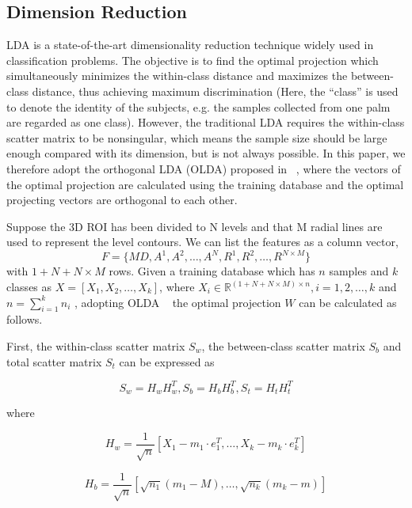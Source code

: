 \subsection{Dimension Reduction}
\label{ssec:methodology:lda}

LDA is a state-of-the-art dimensionality reduction technique widely used in classification problems. The objective is to find the optimal projection which simultaneously minimizes the within-class distance and maximizes the between-class distance, thus achieving maximum discrimination (Here, the “class” is used to denote the identity of the subjects, e.g. the samples collected from one palm are regarded as one class). However, the traditional LDA requires the within-class scatter matrix to be nonsingular, which means the sample size should be large enough compared with its dimension, but is not always possible. In this paper, we therefore adopt the orthogonal LDA (OLDA) proposed in ~\cite{Ye:2005uu}, where the vectors of the optimal projection are calculated using the training database and the optimal projecting vectors are orthogonal to each other.

Suppose the 3D ROI has been divided to N levels and that M radial lines are used to represent the level contours. We can list the features as a column vector,
\begin{equation}
F=\{MD,A^1,A^2,\dots,A^N,R^1,R^2,\dots,R^{N\times M}\}
\end{equation}
with $1+N+N\times M$ rows. Given a training database which has $n$ samples and $k$ classes as $X=[X_1,X_2,\dots,X_k]$, where $X_i \in \mathbb{R}^{(1+N+N\times M)\times n}, i=1,2,\dots,k$ and $n=\sum \limits_{i=1}^k n_i$ , adopting OLDA ~\cite{Ye:2005uu} the optimal projection $W$ can be calculated as follows.

First, the within-class scatter matrix $S_w$, the between-class scatter matrix $S_b$ and total scatter matrix $S_t$ can be expressed as

\begin{equation}
S_w=H_w H_w^T, S_b=H_b H_b^T, S_t=H_t H_t^T
\end{equation}

where

\begin{equation}
H_w=\frac{1}{\sqrt{n}}\left[X_1 - m_1 \cdot e_1^T, \dots, X_k - m_k \cdot e_k^T \right]
\end{equation}

\begin{equation}
H_b=\frac{1}{\sqrt{n}}\left[\sqrt{n_1}(m_1-M),\dots,\sqrt{n_k}(m_k-m) \right]
\end{equation}

